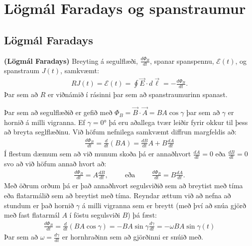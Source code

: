 \ifdefined \wholebook \else\documentclass[oneside]{book}\usepackage{EdlBook}\graphicspath{{figures/}}
\begin{document}
%
\setcounter{chapter}{18} %
%
\fi

\renewcommand{\thefigure}{\arabic{figure}}


\chapter{Lögmál Faradays og spanstraumur}

\section{Lögmál Faradays}

\begin{tcolorbox}
\begin{theorem}
\textbf{(Lögmál Faradays)} Breyting á segulflæði, $\frac{d\Phi_B}{dt}$, spanar spanspennu, $\mathcal{E}(t)$, og spanstraum $J(t)$, samkvæmt:
\begin{align*}
    R J(t) = \mathcal{E}(t) = \oint \Vec{E} \cdot d\vec{\ell} = -\frac{d\Phi_B}{dt}.
\end{align*}
Þar sem að $R$ er viðnámið í rásinni þar sem að spanstraumurinn spanast.
\end{theorem}
\end{tcolorbox}


Þar sem að segulflæðið er gefið með $\Phi_B = \vec{B} \cdot \vec{A} = BA\cos\gamma$ þar sem að $\gamma$ er hornið á milli vigranna. Ef $\gamma = \ang{0}$ þá eru aðallega tvær leiðir fyrir okkur til þess að breyta seglflæðinu. Við höfum nefnilega samkvæmt diffrun margfeldis að:
\begin{align*}
    \frac{d\Phi_B}{dt} = \frac{d}{dt}\left( BA \right) = \frac{dB}{dt} A + B \frac{dA}{dt}
\end{align*}
Í flestum dæmum sem að við munum skoða þá er annaðhvort $\frac{dA}{dt} = 0$ eða $\frac{dB}{dt} = 0$ svo að við höfum annað hvort að:
\begin{align*}
    \frac{d\Phi_B}{dt} = A \frac{dB}{dt}, \hspace{1cm} \text{eða} \hspace{1cm} \frac{d\Phi_B}{dt} = B \frac{dA}{dt}.
\end{align*}
Með öðrum orðum þá er það annaðhvort segulsviðið sem að breytist með tíma eða flatarmálið sem að breytist með tíma. Reyndar ættum við að nefna að stundum er það hornið $\gamma$ á milli vigranna sem er breytt (með því að snúa gjörð með fast flatarmál $A$ í föstu segulsviði $B$) þá fæst:
\begin{align*}
    \frac{d\Phi_B}{dt} = \frac{d}{dt}\left( BA \cos\gamma \right) = -BA\sin\gamma \frac{d\gamma}{dt} = -\omega BA \sin\gamma(t)
\end{align*}
Þar sem að $\omega = \frac{d\gamma}{dt}$ er hornhraðinn sem að gjörðinni er snúið með.
\end{document}
